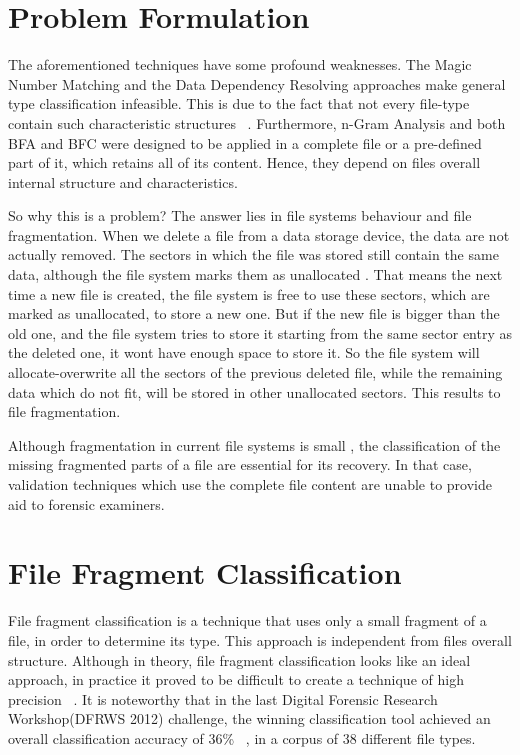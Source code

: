 \section{Problem Formulation}
The aforementioned techniques have some profound weaknesses. The Magic
Number Matching and the Data Dependency Resolving approaches make
general type classification infeasible. This is due to the fact that not every
file-type contain such characteristic structures ~\cite{MacDaniel}. Furthermore, n-Gram Analysis and both
BFA and BFC were designed to be applied in a complete file or a pre-defined
part of it, which retains all of its content. Hence, they depend on files overall internal structure and characteristics.

So why this is a problem? The answer lies in file systems behaviour and
file fragmentation. When we delete a file from a data storage device, the data are
not actually removed. The sectors in which the file was stored still contain
the same data, although the file system marks them as unallocated \cite{Pal}. That
means the next time a new file is created, the file system is free to use
these sectors, which are marked as unallocated, to store a new one. But
if the new file is bigger than the old one, and the file system tries to store it
starting from the same sector entry as the deleted one, it wont have enough
space to store it. So the file system will allocate-overwrite all the sectors of the previous deleted file, while the remaining data which do not fit, will be stored in
other unallocated sectors. This results to file fragmentation.

Although fragmentation in current file systems is small \cite{Garfinkel}, the classification of the missing fragmented parts of a file are essential for its recovery. In that case, validation techniques which use the complete file content
are unable to provide aid to forensic examiners. %
\newpage
\section{File Fragment Classification}
File fragment classification is a technique that uses only a small fragment
of a file, in order to determine its type. This approach is independent from files overall structure. Although in theory, file fragment classification looks like an ideal approach, in practice it proved to be difficult to create a technique of high precision ~\cite{Ashim}. It is noteworthy that in the last Digital Forensic Research Workshop(DFRWS 2012) challenge, the winning classification tool achieved an overall classification accuracy of 36\% ~\cite{Sceadan}, in a corpus of 38 different file types.

